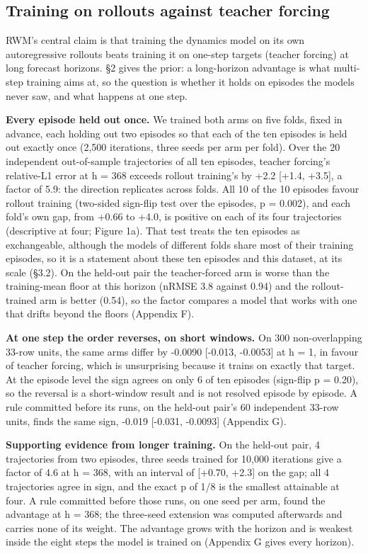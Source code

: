 \documentclass[10pt]{article}
\begin{document}
\subsection{Training on rollouts against teacher forcing}

RWM's central claim is that training the dynamics model on its own autoregressive rollouts beats training it on one-step targets (teacher forcing) at long forecast horizons. \S{}2 gives the prior: a long-horizon advantage is what multi-step training aims at, so the question is whether it holds on episodes the models never saw, and what happens at one step.

\textbf{Every episode held out once.} We trained both arms on five folds, fixed in advance, each holding out two episodes so that each of the ten episodes is held out exactly once (2,500 iterations, three seeds per arm per fold). Over the 20 independent out-of-sample trajectories of all ten episodes, teacher forcing's relative-L1 error at h = 368 exceeds rollout training's by +2.2 [+1.4, +3.5], a factor of 5.9: the direction replicates across folds. All 10 of the 10 episodes favour rollout training (two-sided sign-flip test over the episodes, p = 0.002), and each fold's own gap, from +0.66 to +4.0, is positive on each of its four trajectories (descriptive at four; Figure 1a). That test treats the ten episodes as exchangeable, although the models of different folds share most of their training episodes, so it is a statement about these ten episodes and this dataset, at its scale (\S{}3.2). On the held-out pair the teacher-forced arm is worse than the training-mean floor at this horizon (nRMSE 3.8 against 0.94) and the rollout-trained arm is better (0.54), so the factor compares a model that works with one that drifts beyond the floors (Appendix F).

\textbf{At one step the order reverses, on short windows.} On 300 non-overlapping 33-row units, the same arms differ by -0.0090 [-0.013, -0.0053] at h = 1, in favour of teacher forcing, which is unsurprising because it trains on exactly that target. At the episode level the sign agrees on only 6 of ten episodes (sign-flip p = 0.20), so the reversal is a short-window result and is not resolved episode by episode. A rule committed before its runs, on the held-out pair's 60 independent 33-row units, finds the same sign, -0.019 [-0.031, -0.0093] (Appendix G).

\textbf{Supporting evidence from longer training.} On the held-out pair, 4 trajectories from two episodes, three seeds trained for 10,000 iterations give a factor of 4.6 at h = 368, with an interval of [+0.70, +2.3] on the gap; all 4 trajectories agree in sign, and the exact p of 1/8 is the smallest attainable at four. A rule committed before those runs, on one seed per arm, found the advantage at h = 368; the three-seed extension was computed afterwards and carries none of its weight. The advantage grows with the horizon and is weakest inside the eight steps the model is trained on (Appendix G gives every horizon).
\end{document}
